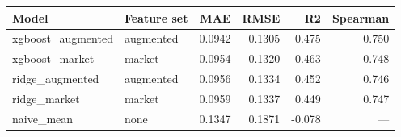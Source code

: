 \begin{tabular}{llrrrr}
\toprule
Model & Feature set & MAE & RMSE & R2 & Spearman \\
\midrule
xgboost\_augmented & augmented & 0.0942 & 0.1305 & 0.475 & 0.750 \\
xgboost\_market & market & 0.0954 & 0.1320 & 0.463 & 0.748 \\
ridge\_augmented & augmented & 0.0956 & 0.1334 & 0.452 & 0.746 \\
ridge\_market & market & 0.0959 & 0.1337 & 0.449 & 0.747 \\
naive\_mean & none & 0.1347 & 0.1871 & -0.078 & --- \\
\bottomrule
\end{tabular}
